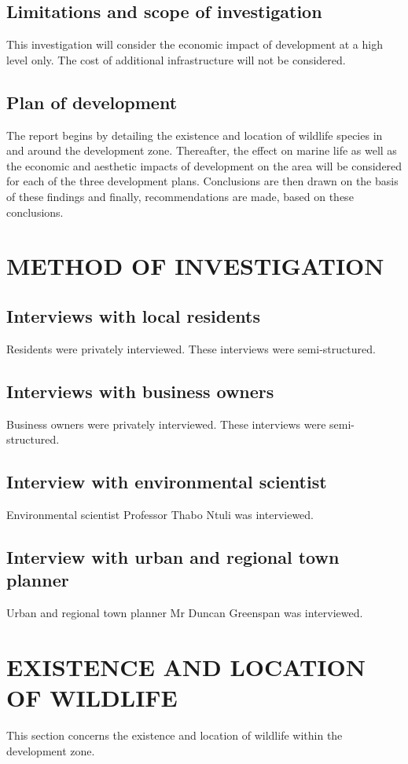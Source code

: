 \documentclass{article}
\begin{document}
\subsection{Limitations and scope of investigation}
This investigation will consider the economic impact of development at a high level only. The cost of additional infrastructure will not be considered.

\subsection{Plan of development}
The report begins by detailing the existence and location of wildlife species in and around the development zone. Thereafter, the effect on marine life as well as the economic and aesthetic impacts of development on the area will be considered for each of the three development plans. Conclusions are then drawn on the basis of these findings and finally, recommendations are made, based on these conclusions.

\newpage
\section{METHOD OF INVESTIGATION}
\subsection{Interviews with local residents}
Residents were privately interviewed. These interviews were semi-structured.

\subsection{Interviews with business owners}
Business owners were privately interviewed. These interviews were semi-structured.

\subsection{Interview with environmental scientist}
Environmental scientist Professor Thabo Ntuli was interviewed.

\subsection{Interview with urban and regional town planner}
Urban and regional town planner Mr Duncan Greenspan was interviewed.

\newpage
\section{EXISTENCE AND LOCATION OF WILDLIFE}
This section concerns the existence and location of wildlife within the development zone.
\end{document}
